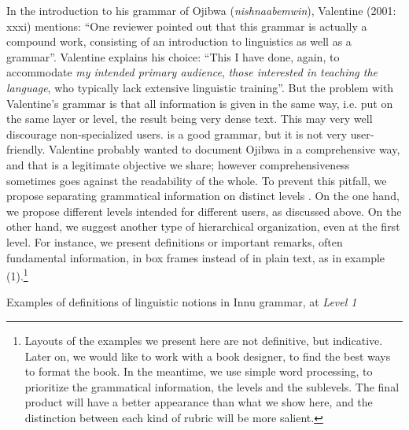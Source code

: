 In the introduction to his grammar of Ojibwa (\textit{nishnaabemwin}), Valentine (2001: xxxi) mentions: ``One reviewer pointed out that this grammar is actually a compound work, consisting of an introduction to linguistics as well as a grammar''. Valentine explains his choice: ``This I have done, again, to accommodate \textit{my intended primary audience}, \textit{those interested in teaching the language}, who typically lack extensive linguistic training''. But the problem with Valentine's grammar is that all information is given in the same way, i.e. put on the same layer or level, the result being very dense text. This may very well discourage non-specialized users.  \citet{Valentine2001} is a good grammar, but it is not very user-friendly. Valentine probably wanted to document Ojibwa in a comprehensive way, and that is a legitimate objective we share; however comprehensiveness sometimes goes against the readability of the whole. To prevent this pitfall, we propose separating grammatical information on distinct levels \citep{Drudetv}. On the one hand, we propose different levels intended for different users, as discussed above. On the other hand, we suggest another type of hierarchical organization, even at the first level. For instance, we present definitions or important remarks, often fundamental information, in box frames instead of in plain text, as in example (1).\footnote{Layouts
 of the examples we present here are not definitive, but indicative. Later on, we would like to work with a book designer, to find the best ways to format the book. In the meantime, we use simple word processing, to prioritize the grammatical information, the levels and the sublevels. The final product will have a better appearance than what we show here, and the distinction between each kind of rubric will be more salient.
} 

\newpage
\ea Examples of definitions of linguistic notions in Innu grammar, at \textit{Level 1}

